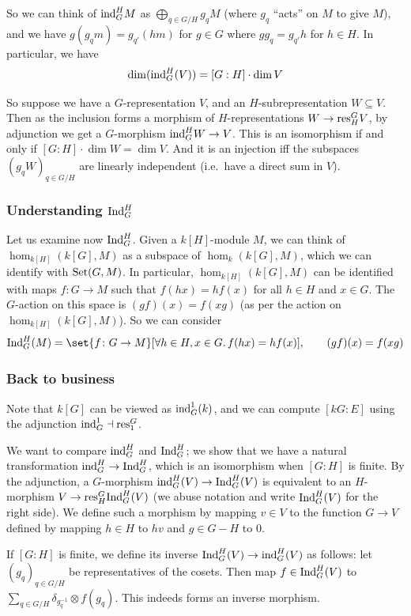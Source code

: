 So we can think of ${\rm ind}^H_GM$ as $\bigoplus_{q\in G/H}g_qM$ (where $g_q$ ``acts'' on $M$ to give $M$), and we have $g(g_qm)=g_{q'}(hm)$ for $g\in G$ where $gg_q=g_{q'}h$ for $h\in H$.
In particular, we have
$$ \dim({\rm ind}^H_G(V)) = [G:H]\cdot\dim V $$

So suppose we have a $G$-representation $V$, and an $H$-subrepresentation $W\subseteq V$.
Then as the inclusion forms a morphism of $H$-representations $W\to{\rm res}^G_HV$, by adjunction we get a $G$-morphism ${\rm ind}^H_GW\to V$.
This is an isomorphism if and only if $[G:H]\cdot\dim W=\dim V$.
And it is an injection iff the subspaces $(g_qW)_{q\in G/H}$ are linearly independent (i.e.\ have a direct sum in $V$).

\subsubsection*{Understanding ${\rm Ind}^H_G$}

Let us examine now ${\rm Ind}^H_G$.
Given a $k[H]$-module $M$, we can think of $\hom_{k[H]}(k[G],M)$ as a subspace of $\hom_k(k[G],M)$, which we can identify with ${\rm Set}(G,M)$.
In particular, $\hom_{k[H]}(k[G],M)$ can be identified with maps $f\colon G\to M$ such that $f(hx)=hf(x)$ for all $h\in H$ and $x\in G$.
The $G$-action on this space is $(gf)(x)=f(xg)$ (as per the action on $\hom_{k[H]}(k[G],M)$).
So we can consider
$$ \Ind^H_G(M) = \set{f\colon G\to M}[\forall h\in H,x\in G.\,f(hx)=hf(x)],\qquad (gf)(x)=f(xg) $$

\subsubsection*{Back to business}

Note that $k[G]$ can be viewed as ${\rm ind}^1_G(k)$, and we can compute $[kG:E]$ using the adjunction ${\rm ind}^1_G\dashv{\rm res}^G_1$.

We want to compare ${\rm ind}^H_G$ and ${\rm Ind}^H_G$; we show that we have a natural transformation ${\rm ind}^H_G\to{\rm Ind}^H_G$, which is an isomorphism when $[G:H]$ is finite.
By the adjunction, a $G$-morphism ${\rm ind}^H_G(V)\to{\rm Ind}^H_G(V)$ is equivalent to an $H$-morphism $V\to{\rm res}^G_H{\rm Ind}^H_G(V)$ (we abuse notation and write ${\rm Ind}^H_G(V)$ for the right side).
We define such a morphism by mapping $v\in V$ to the function $G\to V$ defined by mapping $h\in H$ to $hv$ and $g\in G-H$ to $0$.

If $[G:H]$ is finite, we define its inverse ${\rm Ind}^H_G(V)\to{\rm ind}^H_G(V)$ as follows: let $(g_q)_{q\in G/H}$ be representatives of the cosets.
Then map $f\in{\rm Ind}^H_G(V)$ to $\sum_{q\in G/H}\delta_{g_q^{-1}}\otimes f(g_q)$.
This indeeds forms an inverse morphism.

